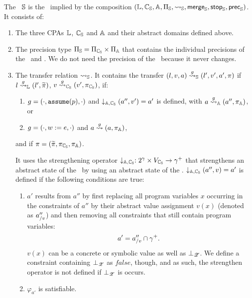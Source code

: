 The \symbolicExecutionCPA\ $\mathbb{S}$ is the \compositeCPA\ implied by the composition
$(\mathbb{L}, \mathbb{C_{S}}, \mathbb{A}, \Pi_{\mathbb{S}}, \rightsquigarrow_{\mathbb{S}}, \operatorname{\operatorname{\mathsf{merge}}}_{\mathbb{S}}, \operatorname{\operatorname{\mathsf{stop}}}_{\mathbb{S}}, \operatorname{\operatorname{\mathsf{prec}}}_{\mathbb{S}})$. It consists of:
\begin{enumerate}[leftmargin=*, label=\arabic*.]
\item The three CPAs $\mathbb{L}$, $\mathbb{C_{S}}$ and $\mathbb{A}$ and their abstract domains defined above.
\item The precision type $\Pi_{\mathbb{S}} = \Pi_{\mathbb{C_{S}}} \times \Pi_{\mathbb{A}}$ that contains the individual precisions of the \symbolicValueAnalysisCPA\ and \constraintsCPA. We do not need the precision of the \locationCPA\ because it never changes.
\item The transfer relation $\rightsquigarrow_{\mathbb{S}}$.
	It contains the transfer $(l, v, a) \overset{g}{\rightsquigarrow}_{\mathbb{S}} (l', v', a', \pi)$ if $l \overset{g}{\rightsquigarrow}_{\mathbb{L}} (l', {\widetilde{\pi}})$, $v \overset{g}{\rightsquigarrow}_{\mathbb{C_{S}}} (v', \pi_{\mathbb{C_{S}}})$, if:
	\begin{enumerate}[label=\alph*)]
		\item $g = (\cdot, \texttt{assume}(p), \cdot)$ and $\downarrow_{{\mathbb{A}}, {\mathbb{C_{S}}}}(a'', v') = a'$ is defined, with $a \overset{g}{\rightsquigarrow}_{\mathbb{A}} (a'', \pi_{\mathbb{A}})$, or

		\item $g = (\cdot, w := e, \cdot)$ and $a \overset{g}{\rightsquigarrow} (a, \pi_{\mathbb{A}})$,
	\end{enumerate}
	and if $\pi = ({\widetilde{\pi}}, \pi_{\mathbb{C_{S}}}, \pi_{\mathbb{A}})$.

	It uses the strengthening operator $\downarrow_{{\mathbb{A}}, {\mathbb{C_{S}}}} : 2^\gamma \times V_{\mathbb{C_{S}}} \rightarrow {\gamma^+}$ that strengthens an abstract state of the \constraintsCPA\ by using an abstract state of the \symbolicValueAnalysisCPA.
	$\downarrow_{{\mathbb{A}}, {\mathbb{C_{S}}}}(a'', v) = a'$ is defined if the following conditions are true:
	\begin{enumerate}[label=\alph*)]
		\item $a'$ results from $a''$ by first replacing all program variables $x$ occurring in the constraints of $a''$ by their abstract value assignment $v(x)$ (denoted as $a''_{/v}$) and then removing all constraints that
			still contain program variables:
			\[ a' = a''_{/v} \cap {\gamma^+}.\]
			$v(x)$ can be a concrete or symbolic value as well as $\bot_{\mathscr{Z}}$. We define a constraint containing $\bot_{\mathscr{Z}}$ as $false$, though, and as such, the strengthen operator is not defined if $\bot_{\mathscr{Z}}$ is occurs.
		\item  $\varphi_{a'}$ is satisfiable.
	\end{enumerate}


\end{enumerate}
